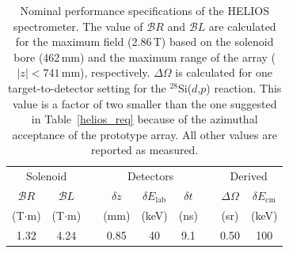 \begin{table}[b]
\centering
\begin{tabular}{ccccccccc}
\hline
\multicolumn{2}{c}{Solenoid}  &  &
\multicolumn{3}{c}{Detectors}  & & 
\multicolumn{2}{c}{Derived}\\ \cline{1-2} \cline{4-6} \cline{8-9}
\multicolumn{1}{c}{$\mathscr{B}R$}  &  
\multicolumn{1}{c}{$\mathscr{B}L$}  & &
\multicolumn{1}{c}{$\delta z$}  &  
\multicolumn{1}{c}{$\delta E_\textrm{lab}$} &
\multicolumn{1}{c}{$\delta t$} &&
\multicolumn{1}{c}{$\Delta \Omega$}  &  
\multicolumn{1}{c}{$\delta E_\mathrm{cm}$}  \\
(T$\cdot$m)&(T$\cdot$m)&&(mm)&(keV)&(ns)&&(sr)&(keV)\\
\hline \hline
1.32&4.24&&0.85&40&9.1&&0.50&100
\\
\hline 
\end{tabular}
\caption[Nominal performance specifications of the HELIOS spectrometer]{Nominal performance specifications of the HELIOS spectrometer.  The value of $\mathscr{B}R$ and $\mathscr{B}L$ are calculated for the maximum field (2.86\,T) based on the solenoid bore (462\,mm) and the maximum range of the array ($|z|<741$\,mm), respectively. $\Delta \Omega$ is calculated for one target-to-detector setting for the $^{28}$Si($d$,$p$) reaction.  This value is a factor of two smaller than the one suggested in Table~\ref{helios_req} because of the azimuthal acceptance of the prototype array.  All other values are reported as measured.}
\label{helios_perform}
\end{table}

\pagebreak

